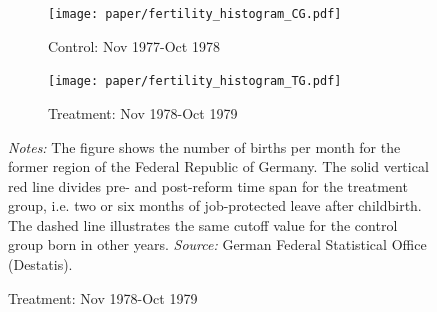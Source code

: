 \documentclass[11pt, a4paper]{article} %
\begin{document}
\begin{landscape}
	\vspace*{\fill}
	\begin{figure}
		[H]\centering
		\caption{Fertility distribution for different years}\label{fig: fertility_hist}
		\begin{subfigure}[h]{0.40\linewidth}\centering
		\caption{Control: Nov 1977-Oct 1978}
		\texttt{[image: paper/fertility\_histogram\_CG.pdf]}
		\end{subfigure}
		\begin{subfigure}[h]{0.40\linewidth}\centering
		\caption{Treatment: Nov 1978-Oct 1979}
		\texttt{[image: paper/fertility\_histogram\_TG.pdf]}
		\end{subfigure}
			\scriptsize
			\begin{minipage}{0.95\linewidth}
				\emph{Notes:} The figure shows the number of births per month for the former region of the Federal Republic of Germany. The solid vertical red line divides pre- and post-reform time span for the treatment group, i.e. two or six months of job-protected leave after childbirth. The dashed line illustrates the same cutoff value for the control group born in other years.\newline
				\emph{Source:} German Federal Statistical Office (Destatis).
			\end{minipage}
	\end{figure}
	\vspace*{\fill}\clearpage
\end{landscape}



\end{document}
